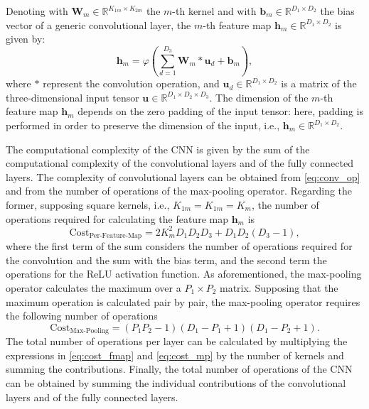 Denoting with $\mathbf{W}_{m} \in \mathbb{R}^{K_{1m}\times K_{2m}}$ the $m$-th kernel and with $\mathbf{b}_{m}  \in \mathbb{R}^{D_1\times D_2}$ the bias vector of a generic convolutional layer, the $m$-th feature map  $\mathbf{h}_{m} \in \mathbb{R}^{D_1\times D_2}$ is given by:
\begin{equation}
\label{eq:conv_op}
\mathbf{h}_{m}=\varphi	\left(\sum_{d=1}^{D_3} \mathbf{W}_{m} \ast \mathbf{u}_d + \mathbf{b}_{m} \right),
\end{equation}
where $\ast$ represent the convolution operation, and $\mathbf{u}_{d} \in \mathbb{R}^{D_1\times D_2} $ is a matrix of the three-dimensional input tensor $\mathbf{u} \in \mathbb{R}^{D_1\times D_2 \times D_3}$. The dimension of the $m$-th feature map $\mathbf{h}_{m}$ depends on the zero padding of the input tensor: here, padding is performed in order to preserve the dimension of the input, i.e., $\mathbf{h}_{m} \in \mathbb{R}^{D_1\times D_2}$. 

The computational complexity of the CNN is given by the sum of the computational complexity of the convolutional layers and of the fully connected layers. The complexity of convolutional layers can be obtained from \eqref{eq:conv_op} and from the number of operations of the max-pooling operator. Regarding the former, supposing square kernels, i.e., $K_{1m} = K_{1m} = K_m$, the number of operations required for calculating the feature map $\mathbf{h}_{m}$ is
\begin{equation}
\label{eq:cost_fmap}
\text{Cost}_{\text{Per-Feature-Map}} =2K_m^2D_1D_2D_3+D_1D_2(D_3-1),
\end{equation}
where the first term of the sum considers the number of operations required for the convolution and the sum with the bias term, and the second term the operations for the ReLU activation function. As aforementioned, the max-pooling operator calculates the maximum over a $P_1 \times P_2 $ matrix. Supposing that the maximum operation is calculated pair by pair, the max-pooling operator requires the following number of operations
\begin{equation}\label{eq:cost_mp}
\text{Cost}_{\text{Max-Pooling}}=(P_1P_2-1)(D_1-P_1+1)(D_1-P_2+1).
\end{equation}
The total number of operations per layer can be calculated by multiplying the expressions in \eqref{eq:cost_fmap} and \eqref{eq:cost_mp} by the number of kernels and summing the contributions. Finally, the total number of operations of the CNN can be obtained by summing the individual contributions of the convolutional layers and of the fully connected layers.


